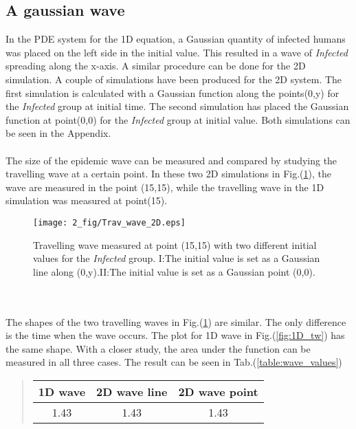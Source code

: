 \documentclass[%
twoside,                 %
final,                   %
chapterprefix=true,      %
open=right               %
10pt]{book}
\begin{document}
\subsection{A gaussian wave}
In the PDE system for the 1D equation, a Gaussian quantity of infected humans was placed on the left side in the initial value. This resulted in a wave of \emph{Infected} spreading along the x-axis. A similar procedure can be done for the 2D simulation. A couple of simulations have been produced for the 2D system. The first simulation is calculated with a Gaussian function along the points(0,y) for the \emph{Infected} group at initial time. The second simulation has placed the Gaussian function at point(0,0) for the \emph{Infected} group at initial value. Both simulations can be seen in the Appendix.  
\\
\\
The size of the epidemic wave can be measured and compared by studying the travelling wave at a certain point. In these two 2D simulations in Fig.(\ref{fig:2D_trav_wave}), the wave are measured in the point (15,15), while the travelling wave in the 1D simulation was measured at point(15). 


\begin{figure}[ht]
  \centerline{\texttt{[image: 2\_fig/Trav\_wave\_2D.eps]}}
  \caption{
  \label{fig:2D_trav_wave} Travelling wave measured at point (15,15) with two different initial values for the \emph{Infected} group. I:The initial value is set as a Gaussian line along (0,y).II:The initial value is set as a Gaussian point (0,0).
  }
\end{figure}


\\
\\
The shapes of the two travelling waves in Fig.(\ref{fig:2D_trav_wave}) are similar. The only difference is the time when the wave occurs. The plot for 1D wave in Fig.(\ref{fig:1D_tw}) has the same shape. With a closer study, the area under the function can be measured in all three cases. The result can be seen in Tab.(\ref{table:wave_values})   


\label{table:wave_values}

\begin{quote}
\begin{tabular}{ccc}
\hline
\multicolumn{1}{c}{ 1D wave } & \multicolumn{1}{c}{ 2D wave line } & \multicolumn{1}{c}{ 2D wave point } \\
\hline
1.43          & 1.43          & 1.43          \\
\hline
\end{tabular}
\end{quote}
\end{document}
